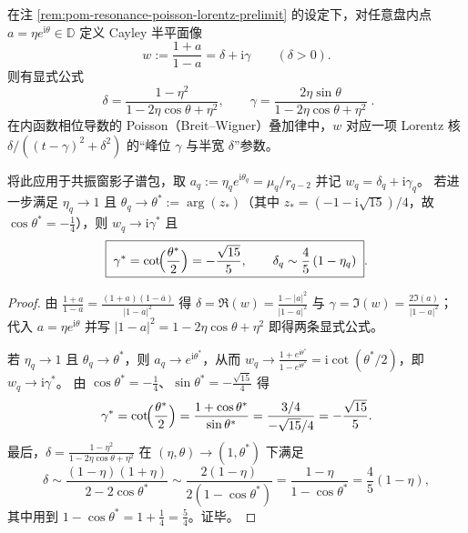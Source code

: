 
\begin{corollary}\label{cor:pom-resonance-cayley-breitwigner-centerwidth}
在注 \ref{rem:pom-resonance-poisson-lorentz-prelimit} 的设定下，对任意盘内点 \(a=\eta e^{\mathrm{i}\theta}\in\mathbb{D}\) 定义 Cayley 半平面像
\[
w:=\frac{1+a}{1-a}=\delta+\mathrm{i}\gamma\qquad(\delta>0).
\]
则有显式公式
\[
\boxed{\;
\delta=\frac{1-\eta^{2}}{1-2\eta\cos\theta+\eta^{2}},
\qquad
\gamma=\frac{2\eta\sin\theta}{1-2\eta\cos\theta+\eta^{2}}\; }.
\]
在内函数相位导数的 Poisson（Breit--Wigner）叠加律中，\(w\) 对应一项 Lorentz 核
\(
\delta\big/((t-\gamma)^2+\delta^2)
\)
的“峰位 \(\gamma\) 与半宽 \(\delta\)”参数。
\par
将此应用于共振窗影子谱包，取
\(
a_q:=\eta_q e^{\mathrm{i}\theta_q}=\mu_q/r_{q-2}
\)
并记 \(w_q=\delta_q+\mathrm{i}\gamma_q\)。
若进一步满足 \(\eta_q\to 1\) 且 \(\theta_q\to \theta^\ast:=\arg(z_\ast)\)（其中 \(z_\ast=(-1-\mathrm{i}\sqrt{15})/4\)，故 \(\cos\theta^\ast=-\tfrac14\)），则 \(w_q\to \mathrm{i}\gamma^\ast\) 且
\[
\boxed{\;
\gamma^\ast=\cot\!\Bigl(\frac{\theta^\ast}{2}\Bigr)=-\frac{\sqrt{15}}{5},
\qquad
\delta_q\sim \frac{4}{5}\,(1-\eta_q)\; }.
\]
\end{corollary}
\begin{proof}
由
\(
\frac{1+a}{1-a}=\frac{(1+a)(1-\overline a)}{|1-a|^2}
\)
得
\(
\delta=\Re(w)=\frac{1-|a|^2}{|1-a|^2}
\)
与
\(
\gamma=\Im(w)=\frac{2\Im(a)}{|1-a|^2}
\)；
代入 \(a=\eta e^{\mathrm{i}\theta}\) 并写 \(|1-a|^2=1-2\eta\cos\theta+\eta^2\) 即得两条显式公式。
\par
若 \(\eta_q\to 1\) 且 \(\theta_q\to\theta^\ast\)，则 \(a_q\to e^{\mathrm{i}\theta^\ast}\)，从而
\(
w_q\to\frac{1+e^{\mathrm{i}\theta^\ast}}{1-e^{\mathrm{i}\theta^\ast}}
=\mathrm{i}\cot(\theta^\ast/2)
\)，即 \(w_q\to \mathrm{i}\gamma^\ast\)。
由 \(\cos\theta^\ast=-\tfrac14\)、\(\sin\theta^\ast=-\tfrac{\sqrt{15}}{4}\) 得
\[
\gamma^\ast=\cot\!\Bigl(\frac{\theta^\ast}{2}\Bigr)=\frac{1+\cos\theta^\ast}{\sin\theta^\ast}
=\frac{3/4}{-\sqrt{15}/4}=-\frac{\sqrt{15}}{5}.
\]
最后，\(\delta=\frac{1-\eta^2}{1-2\eta\cos\theta+\eta^2}\) 在 \((\eta,\theta)\to(1,\theta^\ast)\) 下满足
\[
\delta\sim \frac{(1-\eta)(1+\eta)}{2-2\cos\theta^\ast}
\sim \frac{2(1-\eta)}{2(1-\cos\theta^\ast)}
=\frac{1-\eta}{1-\cos\theta^\ast}
=\frac{4}{5}(1-\eta),
\]
其中用到 \(1-\cos\theta^\ast=1+\tfrac14=\tfrac54\)。证毕。
\end{proof}

